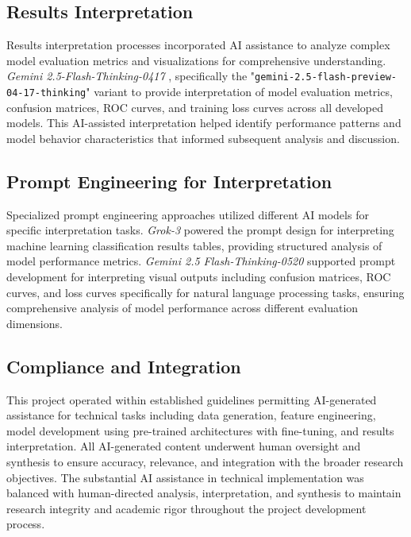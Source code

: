 \subsection{Results Interpretation}

Results interpretation processes incorporated AI assistance to analyze complex model evaluation metrics and visualizations for comprehensive understanding. \textit{Gemini 2.5-Flash-Thinking-0417} \parencite{Doshi_2025}, specifically the "\texttt{gemini-2.5-flash-preview-04-17-thinking}" variant to provide interpretation of model evaluation metrics, confusion matrices, ROC curves, and training loss curves across all developed models. This AI-assisted interpretation helped identify performance patterns and model behavior characteristics that informed subsequent analysis and discussion.

\subsection{Prompt Engineering for Interpretation}

Specialized prompt engineering approaches utilized different AI models for specific interpretation tasks. \textit{Grok-3} \parencite{xGrokBeta} powered the prompt design for interpreting machine learning classification results tables, providing structured analysis of model performance metrics. \textit{Gemini 2.5 Flash-Thinking-0520} \parencite{Doshi_2025} supported prompt development for interpreting visual outputs including confusion matrices, ROC curves, and loss curves specifically for natural language processing tasks, ensuring comprehensive analysis of model performance across different evaluation dimensions.

\subsection{Compliance and Integration}

This project operated within established guidelines permitting AI-generated assistance for technical tasks including data generation, feature engineering, model development using pre-trained architectures with fine-tuning, and results interpretation. All AI-generated content underwent human oversight and synthesis to ensure accuracy, relevance, and integration with the broader research objectives. The substantial AI assistance in technical implementation was balanced with human-directed analysis, interpretation, and synthesis to maintain research integrity and academic rigor throughout the project development process.